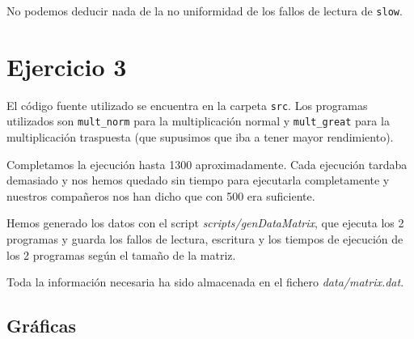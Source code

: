 \documentclass[nochap]{apuntes}
\begin{document}
No podemos deducir nada de la no uniformidad de los fallos de lectura de \texttt{slow}.

\section*{Ejercicio 3}

El código fuente utilizado se encuentra en la carpeta \texttt{src}. Los programas utilizados son \texttt{mult\_norm} para la multiplicación normal y \texttt{mult\_great} para la multiplicación traspuesta (que supusimos que iba a tener mayor rendimiento).

Completamos la ejecución hasta 1300 aproximadamente. Cada ejecución tardaba demasiado y nos hemos quedado sin tiempo para ejecutarla completamente y nuestros compañeros nos han dicho que con 500 era suficiente.

Hemos generado los datos con el script \emph{scripts/genDataMatrix}, que ejecuta los 2 programas y guarda los fallos de lectura, escritura y los tiempos de ejecución de los 2 programas según el tamaño de la matriz.

Toda la información necesaria ha sido almacenada en el fichero \emph{data/matrix.dat}.

\subsection*{Gr\'aficas}
\end{document}
